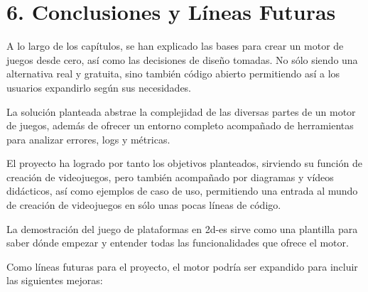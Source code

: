 \chapter*{6. Conclusiones y Líneas Futuras}\label{cap:conclusions}

A lo largo de los capítulos, se han explicado las bases para crear un motor de juegos desde cero, así como las decisiones
de diseño tomadas. No sólo siendo una alternativa real y gratuita, sino también código abierto permitiendo así a los usuarios
expandirlo según sus necesidades.

La solución planteada abstrae la complejidad de las diversas partes de un motor de juegos, además de ofrecer un 
entorno completo acompañado de herramientas para analizar errores, logs y métricas.

El proyecto ha logrado por tanto los objetivos planteados, sirviendo su función de creación de videojuegos, pero también
acompañado por diagramas y vídeos didácticos, así como ejemplos de caso de uso, permitiendo una entrada al mundo de
creación de videojuegos en sólo unas pocas líneas de código.

La demostración del juego de plataformas en \gls{2d-es} sirve como una plantilla para saber dónde empezar y entender todas las 
funcionalidades que ofrece el motor.

Como líneas futuras para el proyecto, el motor podría ser expandido para incluir las siguientes mejoras:

